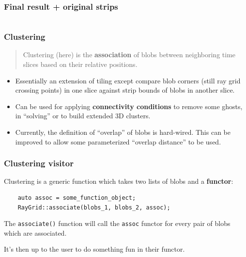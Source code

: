 \documentclass[xcolor=dvipsnames]{beamer}
\begin{document}
\begin{frame}
  \frametitle{Final result + original strips}
  \begin{columns}
    \begin{column}{0.35\textwidth}
      \footnotesize
      
    \end{column}

    \begin{column}{0.7\textwidth}

      \begin{center}
        \tiny
        
      \end{center}
    \end{column}

  \end{columns}
\end{frame}



\begin{frame}
  \frametitle{Clustering}
  \begin{quote}
    Clustering (here) is the \textbf{association} of blobs between neighboring time slices based on their relative positions.
  \end{quote}
  \begin{itemize}
  \item Essentially an extension of tiling except compare blob corners (still ray grid crossing points) in one slice against strip bounds of blobs in another slice.
  \item Can be used for applying \textbf{connectivity conditions} to remove some ghosts, in ``solving'' or to build extended 3D clusters.
  \item Currently, the definition of ``overlap'' of blobs is hard-wired.  This can be improved to allow some parameterized ``overlap distance'' to be used. 
  \end{itemize}
\end{frame}

\begin{frame}[fragile]
  \frametitle{Clustering visitor}
  Clustering is a generic function which takes two lists of blobs and a \textbf{functor}:
\begin{verbatim}
    auto assoc = some_function_object;
    RayGrid::associate(blobs_1, blobs_2, assoc);
\end{verbatim}

  The \texttt{associate()} function will call the \texttt{assoc} functor for every pair of blobs which are associated.

  \vfill

  It's then up to the user to do something fun in their functor.
\end{frame}
\end{document}
